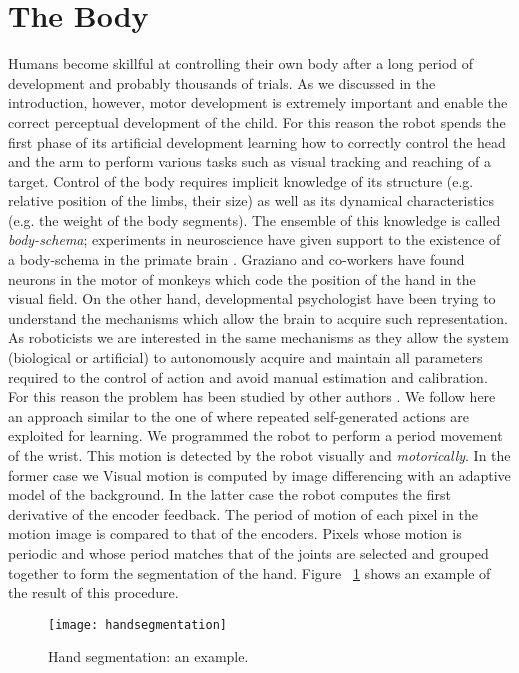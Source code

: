 \section{The Body}
Humans become skillful at controlling their own body after a long period of development and probably thousands of trials. As we discussed in the introduction, however, motor development is extremely important and enable the correct perceptual development of the child. For this reason the robot spends the first phase of its artificial development learning how to correctly control the head and the arm to perform various tasks such as visual tracking and reaching of a target.
Control of the body requires implicit knowledge of its structure (e.g. relative position of the limbs, their size) as well as its dynamical characteristics (e.g. the weight of the body segments). The ensemble of this knowledge is called \emph{body-schema}; experiments in neuroscience have given support to the existence of a body-schema in the primate brain \cite{graziano99whereis,graziano00coding}. Graziano and co-workers have found neurons in the motor of monkeys which code the position of the hand in the visual field.
On the other hand, developmental psychologist have been trying to understand the mechanisms which allow the brain to acquire such representation. As roboticists we are interested in the same mechanisms as they allow the system (biological or artificial) to autonomously acquire and maintain all parameters required to the control of action and avoid manual estimation and calibration. For this reason the problem has been studied by other authors \cite{yoshikawa03doestheinvariance,fitzpatrick04feelthebeat,metta03early}.
We follow here an approach similar to the one of \cite{fitzpatrick04feelthebeat,metta03early} where repeated self-generated actions are exploited for learning. We programmed the robot to perform a period movement of the wrist. This motion is detected by the robot visually and \emph{motorically}. In the former case we Visual motion is computed by image differencing with an adaptive model of the background. In the latter case the robot computes the first derivative of the encoder feedback. The period of motion of each pixel in the motion image is compared to that of the encoders. Pixels whose motion is periodic and whose period matches that of the joints are selected and grouped together to form the segmentation of the hand. Figure ~\ref{fig-handsegmentation} shows an example of the result of this procedure.

\begin{figure}
\centering
\texttt{[image: handsegmentation]}
\caption{Hand segmentation: an example.}
\label{fig-handsegmentation}
\end{figure}

